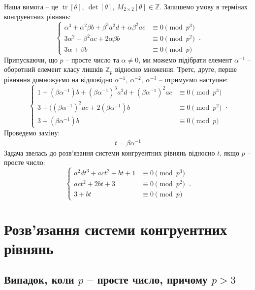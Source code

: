 \documentclass{thesis}
\DeclareMathOperator{\tr}{tr}
\begin{document}
Наша вимога -- це $\tr [\theta],\ \det [\theta],\ M_{2 \times 2}[\theta] \in \mathbb{Z}$. Запишемо умову в термінах конгруентних рівнянь:
\begin{equation}
    \begin{cases}
      \alpha^3 + \alpha^2 \beta b + \beta^3 a^2 d + \alpha \beta^2 a c & \equiv 0 \pmod {p^3} \\
    3\alpha^2 + \beta^2 ac + 2 \alpha \beta b & \equiv 0 \pmod {p^2} \\
      3 \alpha + \beta b & \equiv 0 \pmod p 
    \end{cases}\,.
\end{equation}
Припускаючи, що $p$ -- просте число та $\alpha \neq 0$, ми можемо підібрати елемент $\alpha^{-1}$ -- оборотний елемент класу лишків $\mathbb{Z}_p$ відносно множення. Третє, друге, перше рівняння домножуємо на відповідно $\alpha^{-1},\ \alpha^{-2},\ \alpha^{-3}$ -- отримуємо наступне:
\begin{equation*}
    \begin{cases}
      1 + (\beta \alpha^{-1}) b + (\beta \alpha^{-1})^{3} a^2 d + (\beta \alpha^{-1})^2 a c & \equiv 0 \pmod {p^3} \\
    3 + ((\beta \alpha^{-1})^2 ac + 2 (\beta \alpha^{-1}) b & \equiv 0 \pmod {p^2} \\
      3 + (\beta \alpha^{-1})b & \equiv 0 \pmod p 
    \end{cases}\,.
\end{equation*}
Проведемо заміну:
\begin{align}
t = \beta \alpha^{-1}
\end{align}
Задача звелась до розв'язання системи конгруентних рівнянь відносно $t$, якщо $p$ -- просте число: 
\begin{equation}
\label{system_congruent_equations}
    \begin{cases}
      a^2 d t^3 + ac t^2 + bt + 1 & \equiv 0 \pmod {p^3} \\
      act^2 + 2bt + 3 & \equiv 0 \pmod {p^2} \\
      3 + bt & \equiv 0 \pmod p 
    \end{cases}\,.
\end{equation}

\section{Розв'язання системи конгруентних рівнянь}
\subsection{Випадок, коли $p$ -- просте число, причому $p > 3$}
\end{document}
